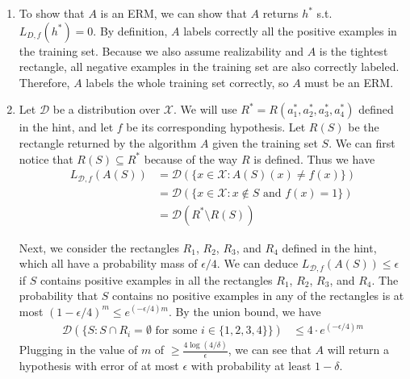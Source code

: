 \documentclass[10pt]{article}
\newenvironment{problem}[2][Problem]{\begin{trivlist}
\item[\hskip \labelsep {\bfseries #1}\hskip \labelsep {\bfseries #2.}]}{\end{trivlist}}
\begin{document}
\begin{problem}{3} \hfill
    \begin{enumerate}
        \item To show that $A$ is an ERM, we can show that $A$ returns $h^*$ s.t. $L_{D, f}(h^*) = 0$.
            By definition, $A$ labels correctly all the positive examples in the training set. Because we also assume realizability and $A$ is the tightest rectangle, all negative examples in the training set are also correctly labeled. Therefore, $A$ labels the whole training set correctly, so $A$ must be an ERM.
        \item 
            Let $\mathcal{D}$ be a distribution over $\mathcal{X}$.
            We will use $R^* = R(a_1^*, a_2^*, a_3^*, a_4^*)$ defined in the hint, and let $f$ be its corresponding hypothesis.
            Let $R(S)$ be the rectangle returned by the algorithm $A$ given the training set $S$.
            We can first notice that $R(S) \subseteq R^*$ because of the way $R$ is defined. Thus we have
            \begin{align*}
                L_{\mathcal{D}, f}(A(S)) & = \mathcal{D}(\{x \in \mathcal{X} : A(S)(x) \neq f(x)\}) \\
                                        &= \mathcal{D}(\{x \in \mathcal{X} : x \not\in S \text{ and } f(x) = 1\}) \\
                                        &= \mathcal{D}(R^* \setminus R(S))
            \end{align*}

            Next, we consider the rectangles $R_1$, $R_2$, $R_3$, and $R_4$ defined in the hint, which all have a probability mass of $\epsilon / 4$.
            We can deduce $L_{\mathcal{D}, f}(A(S)) \leq \epsilon$ if $S$ contains positive examples in all the rectangles
            $R_1$, $R_2$, $R_3$, and $R_4$. The probability that $S$ contains no positive examples in any of the rectangles is at most $(1 - \epsilon / 4)^m \leq e^{(-\epsilon/4)m}$. By the union bound, we have
            \begin{align*}
                \mathcal{D}(\{S : S \cap R_i = \emptyset \text{ for some } i \in \{1, 2, 3, 4\}\}) & \leq 4 \cdot e^{(-\epsilon/4)m}
            \end{align*}
            Plugging in the value of $m$ of $\geq \frac{4 \log(4/\delta)}{\epsilon}$, we can see that $A$ will return a hypothesis with error of at most $\epsilon$ with probability at least $1 - \delta$.
    \end{enumerate}
\end{problem}
\end{document}
